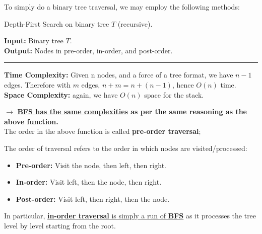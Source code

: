 \noindent
To simply do a binary tree traversal, we may employ the following methods:
\begin{Func}
    Depth-First Search on binary tree $T$ (recursive).
    
    \vspace{.5em}
    \noindent
    \textbf{Input:} Binary tree $T$.\\
    \textbf{Output:} Nodes in pre-order, in-order, and post-order.
    
    \begin{algorithm}[H]
        \SetAlgoLined
    \end{algorithm}
    \noindent
    \rule{\textwidth}{0.4pt}
    \textbf{Time Complexity:} Given n nodes, and a force of a tree format, we have $n-1$ edges. Therefore with $m$ edges, $n+m = n+(n-1)$, hence $O(n)$ time.\\
    \textbf{Space Complexity:} again, we have $O(n)$ space for the stack.
\end{Func}

\noindent
$\mathbf{\rightarrow}$ \textbf{\underline{BFS has the same complexities} as per the same reasoning as the above function.}\\

\newpage
\noindent
The order in the above function is called \textbf{pre-order traversal};

\begin{Def}

    The order of traversal refers to the order in which nodes are visited/processed:
    \begin{itemize}
        \item \textbf{Pre-order:} Visit the node, then left, then right.
        \item \textbf{In-order:} Visit left, then the node, then right.
        \item \textbf{Post-order:} Visit left, then right, then the node.
    \end{itemize}
    In particular, \underline{\textbf{in-order traversal} is simply a run of \textbf{BFS}} as it processes the tree level by level starting 
    from the root.
\end{Def}

